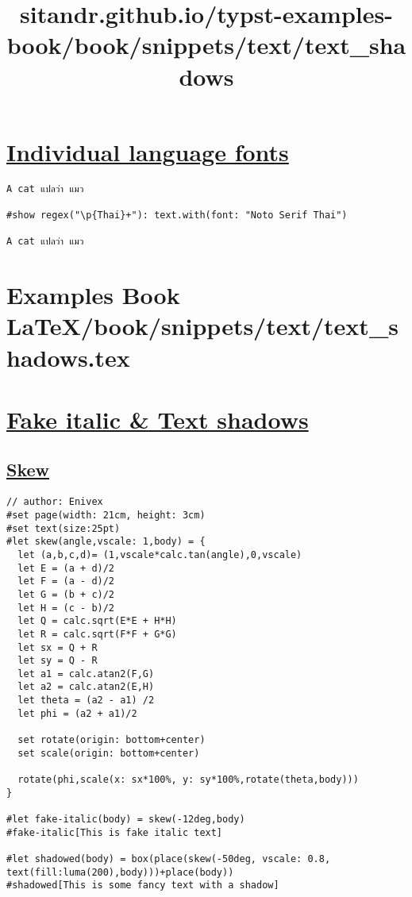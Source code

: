 \section{\texorpdfstring{\hyperref[individual-language-fonts]{Individual
language
fonts}}{Individual language fonts}}\label{individual-language-fonts}

\begin{verbatim}
A cat แปลว่า แมว

#show regex("\p{Thai}+"): text.with(font: "Noto Serif Thai")

A cat แปลว่า แมว
\end{verbatim}

\pandocbounded{}


\section{Examples Book LaTeX/book/snippets/text/text_shadows.tex}
\title{sitandr.github.io/typst-examples-book/book/snippets/text/text_shadows}

\section{\texorpdfstring{\hyperref[fake-italic--text-shadows]{Fake
italic \& Text
shadows}}{Fake italic \& Text shadows}}\label{fake-italic--text-shadows}

\subsection{\texorpdfstring{\hyperref[skew]{Skew}}{Skew}}\label{skew}

\begin{verbatim}
// author: Enivex
#set page(width: 21cm, height: 3cm)
#set text(size:25pt)
#let skew(angle,vscale: 1,body) = {
  let (a,b,c,d)= (1,vscale*calc.tan(angle),0,vscale)
  let E = (a + d)/2
  let F = (a - d)/2
  let G = (b + c)/2
  let H = (c - b)/2
  let Q = calc.sqrt(E*E + H*H)
  let R = calc.sqrt(F*F + G*G)
  let sx = Q + R
  let sy = Q - R
  let a1 = calc.atan2(F,G)
  let a2 = calc.atan2(E,H)
  let theta = (a2 - a1) /2
  let phi = (a2 + a1)/2

  set rotate(origin: bottom+center)
  set scale(origin: bottom+center)

  rotate(phi,scale(x: sx*100%, y: sy*100%,rotate(theta,body)))
}

#let fake-italic(body) = skew(-12deg,body)
#fake-italic[This is fake italic text]

#let shadowed(body) = box(place(skew(-50deg, vscale: 0.8, text(fill:luma(200),body)))+place(body))
#shadowed[This is some fancy text with a shadow]
\end{verbatim}

